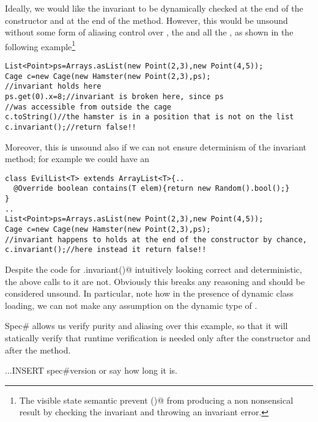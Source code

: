 Ideally, we would like the invariant to be dynamically checked 
at the end of the constructor and at the end of the \Q@move@ method.
However, this would be unsound without some form of aliasing control over \Q@Hamster@,
the \Q@List@ and all the \Q@Point@s, as shown in the following example\footnote{
The visible state semantic prevent \Q@toString()@ from producing a non nonsensical result
by checking the invariant and throwing an invariant error.
}
\begin{lstlisting}
List<Point>ps=Arrays.asList(new Point(2,3),new Point(4,5));
Cage c=new Cage(new Hamster(new Point(2,3),ps);
//invariant holds here
ps.get(0).x=8;//invariant is broken here, since ps
//was accessible from outside the cage
c.toString()//the hamster is in a position that is not on the list
c.invariant();//return false!!
\end{lstlisting}

Moreover, this is unsound also if we can not ensure determinism of the invariant method;
for example we could have an \Q@EvilList@

\begin{lstlisting}
class EvilList<T> extends ArrayList<T>{..
  @Override boolean contains(T elem){return new Random().bool();}
}
..
List<Point>ps=Arrays.asList(new Point(2,3),new Point(4,5));
Cage c=new Cage(new Hamster(new Point(2,3),ps);
//invariant happens to holds at the end of the constructor by chance,
c.invariant();//here instead it return false!!
\end{lstlisting}

Despite the code for \Q@Cage.invariant()@ intuitively looking correct and deterministic, the above calls to it are not. Obviously this breaks any reasoning and should be considered unsound. 
In particular, note how in the presence of dynamic class loading, 
we can not make any assumption on the dynamic type of \Q@path@.

Spec\# allows us verify purity and aliasing over this example, so that
it will statically verify that runtime verification is needed only
after the constructor and after the \Q@move@ method.

...INSERT spec\#version or say how long it is.

